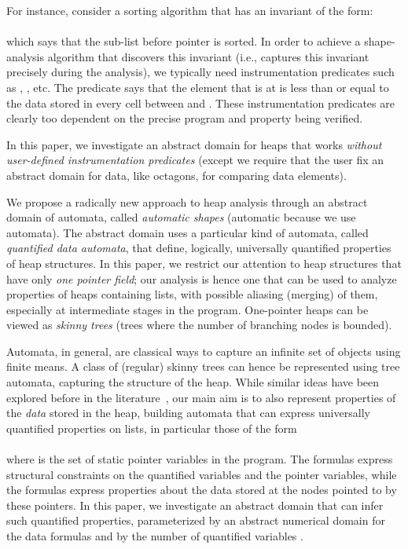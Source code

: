 \documentclass{llncs}
\begin{document}
For instance, consider a sorting algorithm that has an invariant of the form:\\
\\
which says that the sub-list before pointer  is sorted.
In order to achieve a shape-analysis algorithm that discovers this invariant
 (i.e., captures this invariant precisely during the analysis),
we typically need instrumentation predicates such as ,
, etc.
The predicate  says that the element that is at  is less than
or equal to the data stored in every cell between  and .
These instrumentation predicates are clearly too dependent on the precise program and property
 being verified.



In this paper, we investigate an abstract domain for heaps that works \emph{without
user-defined instrumentation predicates} (except we require that the user fix an
abstract domain for data, like octagons, for comparing data elements).



We propose a radically new approach to heap analysis through an abstract domain
of automata, called \emph{automatic shapes} (automatic because we use automata).
The abstract domain uses a particular kind of automata, called \emph{quantified data automata}, that define, logically, universally quantified properties of heap structures. In this paper, we restrict our attention to heap structures that
have only \emph{one pointer field}; our analysis is hence one that can be used to analyze
properties of heaps containing lists, with possible aliasing (merging) of them,
especially at intermediate stages in the program. One-pointer heaps can be viewed
as \emph{skinny trees} (trees where the number of branching nodes is bounded).



Automata, in general, are classical ways to capture an infinite set of objects using
finite means. A class of (regular) skinny trees can hence be represented using tree
automata, capturing the structure of the heap. While similar ideas have been
explored before in the literature~\cite{forest-automata}, our main aim is to also represent properties of
the \emph{data} stored in the heap, building automata that can express
universally quantified properties on lists, in particular those
of the form\\\newline
 \\\newline
where  is the set of static pointer variables in the program.
The  formulas express structural constraints on the quantified variables
and the pointer variables, while the  formulas express properties about the
data stored at the nodes pointed to by these pointers. In this paper, we investigate
an abstract domain that can infer such quantified properties, parameterized by an abstract
numerical domain  for the data formulas and by the number of quantified variables .
\end{document}
